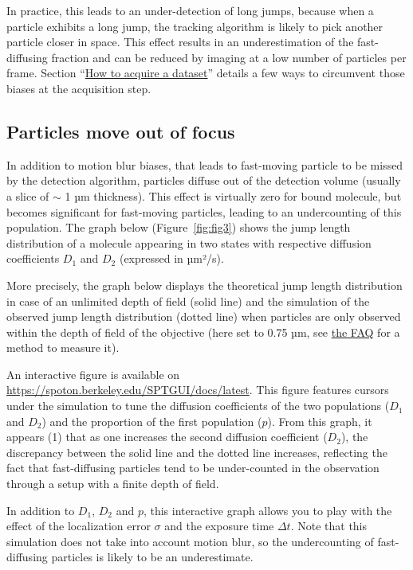 In practice, this leads to an under-detection of long jumps, because when a particle exhibits a long jump, the tracking algorithm is likely to pick another particle closer in space. This effect results in an underestimation of the fast-diffusing fraction and can be reduced by imaging at a low number of particles per frame. Section ``\href{https://spoton.berkeley.edu/SPTGUI/docs/latest#how-to-acquire-a-good-dataset-}{How to acquire a dataset}'' details a few ways to circumvent those biases at the acquisition step.

\subsection{Particles move out of focus}

In addition to motion blur biases, that leads to fast-moving particle to be missed by the detection algorithm, particles diffuse out of the detection volume (usually a slice of \(\sim\) 1 µm thickness). This effect is virtually zero for bound molecule, but becomes significant for fast-moving particles, leading to an undercounting of this population. The graph below (Figure~\ref{fig:fig3}) shows the jump length distribution of a molecule appearing in two states with respective diffusion coefficients \(D_1\) and \(D_2\) (expressed in µm²/s).

More precisely, the graph below displays the theoretical jump length distribution in case of an unlimited depth of field (solid line) and the simulation of the observed jump length distribution (dotted line) when particles are only observed within the depth of field of the objective (here set to 0.75 µm, see \href{https://spoton.berkeley.edu/SPTGUI/docs/latest#measure-locerror}{the FAQ} for a method to measure it).

An interactive figure is available on \url{https://spoton.berkeley.edu/SPTGUI/docs/latest}. This figure features cursors under the simulation to tune the diffusion coefficients of the two populations (\(D_1\) and \(D_2\)) and the proportion of the first population (\(p\)). From this graph, it appears (1) that as one increases the second diffusion coefficient (\(D_2\)), the discrepancy between the solid line and the dotted line increases, reflecting the fact that fast-diffusing particles tend to be under-counted in the observation through a setup with a finite depth of field.

In addition to \(D_1\), \(D_2\) and \(p\), this interactive graph allows you to play with the effect of the localization error \(\sigma\) and the exposure time \(\Delta t\). Note that this simulation does not take into account motion blur, so the undercounting of fast-diffusing particles is likely to be an underestimate.

